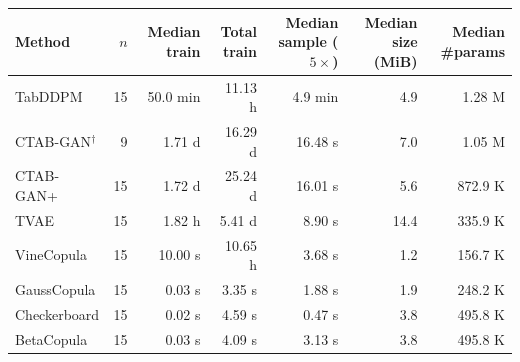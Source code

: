 \begin{tabular}{lrrrrrr}
\toprule
Method & $n$ & Median train & Total train & Median sample ($5\times$) & Median size (MiB) & Median \#params \\
\midrule
TabDDPM & 15 & 50.0 min & 11.13 h & 4.9 min & 4.9 & 1.28 M \\
CTAB-GAN$^{\dagger}$ & 9 & 1.71 d & 16.29 d & 16.48 s & 7.0 & 1.05 M \\
CTAB-GAN+ & 15 & 1.72 d & 25.24 d & 16.01 s & 5.6 & 872.9 K \\
TVAE & 15 & 1.82 h & 5.41 d & 8.90 s & 14.4 & 335.9 K \\
VineCopula & 15 & 10.00 s & 10.65 h & 3.68 s & 1.2 & 156.7 K \\
GaussCopula & 15 & 0.03 s & 3.35 s & 1.88 s & 1.9 & 248.2 K \\
Checkerboard & 15 & 0.02 s & 4.59 s & 0.47 s & 3.8 & 495.8 K \\
BetaCopula & 15 & 0.03 s & 4.09 s & 3.13 s & 3.8 & 495.8 K \\
\bottomrule
\end{tabular}
